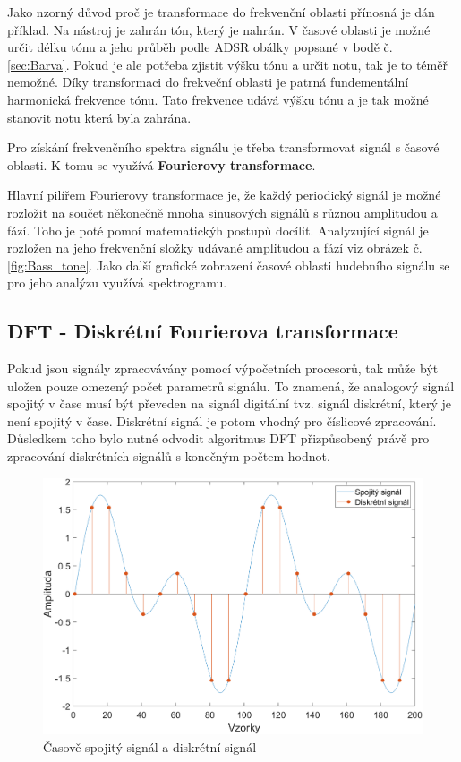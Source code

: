   Jako nzorný důvod proč je transformace do frekvenční oblasti přínosná je dán příklad. Na nástroj je zahrán tón, který je nahrán. 
  V časové oblasti je možné určit délku tónu a jeho průběh podle ADSR obálky popsané v bodě č. \ref*{sec:Barva}.
  Pokud je ale potřeba zjistit výšku tónu a určit notu, tak je to téměř nemožné.
  Díky transformaci do frekveční oblasti je patrná fundementální harmonická frekvence tónu.
  Tato frekvence udává výšku tónu a je tak možné stanovit notu která byla zahrána.

  Pro získání frekvenčního spektra signálu je třeba transformovat signál s časové oblasti.
  K tomu se využívá \textbf{Fourierovy transformace}. 

  Hlavní pilířem Fourierovy transformace je, že každý periodický signál je možné rozložit na součet někonečně mnoha sinusových signálů s různou amplitudou a fází.
  Toho je poté pomoí matematickýh postupů docílit.
  Analyzující signál je rozložen na jeho frekvenční složky udávané amplitudou a fází viz obrázek č.\ref*{fig:Bass_tone}.
  Jako další grafické zobrazení časové oblasti hudebního signálu se pro jeho analýzu využívá spektrogramu.


  \subsection{DFT - Diskrétní Fourierova transformace} \label{sec:DFT}

  Pokud jsou signály zpracovávány pomocí výpočetních procesorů,
  tak může být uložen pouze omezený počet parametrů signálu.
  To znamená, že analogový signál spojitý v čase musí být převeden na signál digitální tvz. signál diskrétní, který je není spojitý v čase. 
  Diskrétní signál je potom vhodný pro číslicové zpracování.
  Důsledkem toho bylo nutné odvodit algoritmus \acs{DFT} přizpůsobený právě pro zpracování diskrétních signálů s konečným počtem hodnot.

  \begin{figure}[H]
    \centering
    \includegraphics[width = 0.8\linewidth]{obrazky/Discrete_signal.png}
    \caption{Časově spojitý signál a diskrétní signál}
    \label{fig:Discrete_signal}
  \end{figure}

